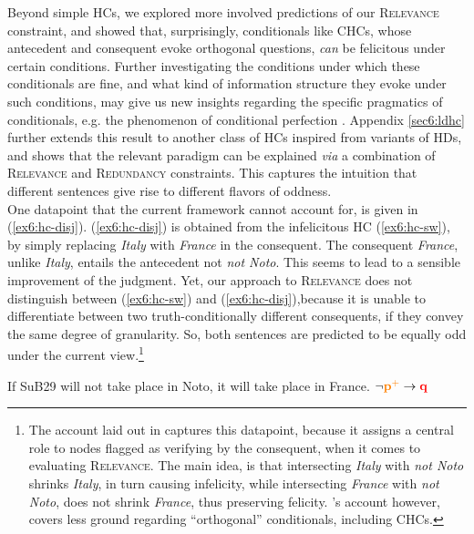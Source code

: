 Beyond simple HCs, we explored more involved predictions of our \textsc{Relevance} constraint, and showed that, surprisingly, conditionals like CHCs, whose antecedent and consequent evoke orthogonal questions, \textit{can} be felicitous under certain conditions. Further investigating the conditions under which these conditionals are fine, and what kind of information structure they evoke under such conditions, may give us new insights regarding the specific pragmatics of conditionals, e.g. the phenomenon of conditional perfection \parencite{Geis1971, Lilje1972, Horn1972, deCornulier1983, Matsumoto1995, vanDerAuwera1997, vonFintel1997, vonFintel2001, Herburger2015, Herburger2016, Bassi2018}. Appendix \ref{sec6:ldhc} further extends this result to another class of HCs inspired from variants of HDs, and shows that the relevant paradigm can be explained \textit{via} a combination of \textsc{Relevance} and \textsc{Redundancy} constraints. This captures the intuition that different sentences give rise to different flavors of oddness.\\

One datapoint that the current framework cannot account for, is given in (\ref{ex6:hc-disj}). (\ref{ex6:hc-disj}) is obtained from the infelicitous HC (\ref{ex6:hc-sw}), by simply replacing \textit{Italy} with \textit{France} in the consequent. The consequent \textit{France}, unlike \textit{Italy}, entails the antecedent not \textit{not Noto}. This seems to lead to a sensible improvement of the judgment. Yet, our approach to \textsc{Relevance} does not distinguish between (\ref{ex6:hc-sw}) and (\ref{ex6:hc-disj}),because it is unable to differentiate between two truth-conditionally different consequents, if they convey the same degree of granularity. So, both sentences are predicted to be equally odd under the current view.\footnote{The account laid out in \textcite{HenotMortier2024a} captures this datapoint, because it assigns a central role to nodes flagged as verifying by the consequent, when it comes to evaluating \textsc{Relevance}. The main idea, is that intersecting \textit{Italy} with \textit{not Noto} shrinks \textit{Italy}, in turn causing infelicity, while intersecting \textit{France} with \textit{not Noto}, does not shrink \textit{France}, thus preserving felicity. \citeauthor{HenotMortier2024a}'s account however, covers less ground regarding ``orthogonal'' conditionals, including CHCs.}

\begin{exe}
	\ex \label{ex6:hc-disj} {If SuB29 will not take place in Noto, it will take place in France. \hfill $\neg \textbf{\textcolor{orange}{p$^+$}}\rightarrow \textbf{\textcolor{red}{q}}$}
\end{exe}

